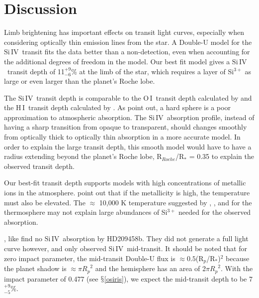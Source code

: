 \documentclass[manuscript]{aastex}
\newcommand{\oi}{\ensuremath{\mathrm{O}\,\scriptstyle \mathrm{I}}}
\newcommand{\hi}{\ensuremath{\mathrm{H}\,\scriptstyle \mathrm{I}}}
\newcommand{\siIV}{\ensuremath{\mathrm{Si}\,\scriptstyle \mathrm{IV}}}
\newcommand{\p}{R$_p$/R$_*$}
\newcommand{\lya}{Lyman-$\alpha$}
\begin{document}
\section{Discussion} \label{discuss}

Limb brightening has important effects on transit light curves, especially when considering optically thin emission lines from the star. A Double-U model for the \siIV\ transit fits the data better than a non-detection, even when accounting for the additional degrees of freedom in the model. Our best fit model gives a \siIV\ transit depth of 11$^{+9}_{-6}$\% at the limb  of the star, which requires a layer of Si$^{3+}$ as large or even larger than the planet's Roche lobe.

The \siIV\ transit depth is comparable to the \oi\ transit depth calculated by \citet{vidmad} and the \hi\ transit depth calculated by \citet{benjaf7}. As \citet{kosk} point out, a hard sphere is a poor approximation to atmospheric absorption. The \siIV\ absorption profile, instead of having a sharp transition from opaque to transparent, should changes smoothly from optically thick to optically thin absorption in a more accurate model. In order to explain the large transit depth, this smooth model would have to have a radius extending beyond the planet's Roche lobe, R$_{Roche}$/R$_*$ = 0.35 \citep{ben10} to explain the observed transit depth.

Our best-fit transit depth supports models with high concentrations of metallic ions in the atmosphere. \citet{kosk} point out that if the metallicity is high, the temperature must also be elevated. The $\approx$ 10,000 K temperature suggested by \citet{gmunoz}, \citet{mclay}, and \citet{kosk} for the thermosphere may not explain large abundances of Si$^{3+}$ needed for the observed absorption. 


\citet{linsky}, like \citet{vidmad} find no \siIV\ absorption by HD209458b. They did not generate a full light curve however, and only observed \siIV\ mid-transit. It should be noted that for zero impact parameter, the mid-transit Double-U flux is $\approx 0.5 $(\p)$^2$ because the planet shadow is $\approx \pi {R_p}^2$ and the hemisphere has an area of 2$\pi {R_p}^2$. With the impact parameter of 0.477 (see $\mathsection$\ref{osiris}), we expect the mid-transit depth to be  7$^{+9}_{-5}$\%. 
\end{document}
